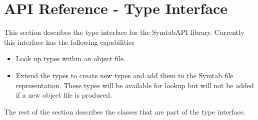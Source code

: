 \section{API Reference - Type Interface}
This section describes the type interface for the SymtabAPI library. Currently this interface has the following capabilities
\begin{itemize}
    \item Look up types within an object file.
    \item Extend the types to create new types and add them to the Symtab file representation. These types will be available for lookup but will not be added if a new object file is produced.
\end{itemize}
    
The rest of the section describes the classes that are part of the type interface.


